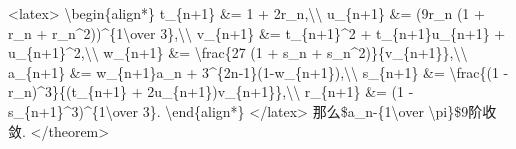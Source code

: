 \documentclass[
]{article}
\begin{document}
\textless latex\textgreater{} \textbackslash begin\{align*\} t\_\{n+1\}
\&= 1 + 2r\_n,\textbackslash\textbackslash{} u\_\{n+1\} \&= (9r\_n (1 +
r\_n + r\_n\^{}2))\^{}\{1\textbackslash over
3\},\textbackslash\textbackslash{} v\_\{n+1\} \&= t\_\{n+1\}\^{}2 +
t\_\{n+1\}u\_\{n+1\} + u\_\{n+1\}\^{}2,\textbackslash\textbackslash{}
w\_\{n+1\} \&= \textbackslash frac\{27 (1 + s\_n +
s\_n\^{}2)\}\{v\_\{n+1\}\},\textbackslash\textbackslash{} a\_\{n+1\} \&=
w\_\{n+1\}a\_n +
3\^{}\{2n-1\}(1-w\_\{n+1\}),\textbackslash\textbackslash{} s\_\{n+1\}
\&= \textbackslash frac\{(1 - r\_n)\^{}3\}\{(t\_\{n+1\} +
2u\_\{n+1\})v\_\{n+1\}\},\textbackslash\textbackslash{} r\_\{n+1\} \&=
(1 - s\_\{n+1\}\^{}3)\^{}\{1\textbackslash over 3\}.
\textbackslash end\{align*\} \textless/latex\textgreater{}
那么\$\textbar a\_n-\{1\textbackslash over
\textbackslash pi\}\textbar\$9阶收敛. \textless/theorem\textgreater{}
\end{document}
